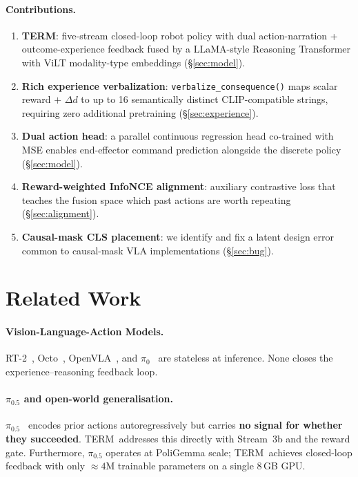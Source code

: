 \documentclass{article}
\newcommand{\modelname}{\textsc{TERM}\xspace}
\begin{document}
\paragraph{Contributions.}
\begin{enumerate}[leftmargin=1.5em,itemsep=2pt]
\item \textbf{\modelname}: five-stream closed-loop robot policy with dual
  action-narration + outcome-experience feedback fused by a LLaMA-style
  Reasoning Transformer with ViLT modality-type embeddings (\S\ref{sec:model}).
\item \textbf{Rich experience verbalization}: \texttt{verbalize\_consequence()}
  maps scalar reward $+$ $\Delta d$ to up to 16 semantically distinct
  CLIP-compatible strings, requiring zero additional pretraining (\S\ref{sec:experience}).
\item \textbf{Dual action head}: a parallel continuous regression head
  co-trained with MSE enables end-effector command prediction alongside the
  discrete policy (\S\ref{sec:model}).
\item \textbf{Reward-weighted InfoNCE alignment}: auxiliary contrastive loss
  that teaches the fusion space which past actions are worth repeating
  (\S\ref{sec:alignment}).
\item \textbf{Causal-mask CLS placement}: we identify and fix a latent
  design error common to causal-mask VLA implementations (\S\ref{sec:bug}).
\end{enumerate}

\section{Related Work}
\label{sec:related}

\paragraph{Vision-Language-Action Models.}
RT-2~\citep{brohan2023rt2}, Octo~\citep{octo2024}, OpenVLA~\citep{kim2024openvla},
and $\pi_0$~\citep{black2024pi0} are stateless at inference.
None closes the experience--reasoning feedback loop.

\paragraph{$\pi_{0.5}$ and open-world generalisation.}
$\pi_{0.5}$~\citep{hejna2025pi05} encodes prior actions autoregressively
but carries \textbf{no signal for whether they succeeded}.
\modelname\ addresses this directly with Stream~3b and the reward gate.
Furthermore, $\pi_{0.5}$ operates at PoliGemma scale;
\modelname\ achieves closed-loop feedback with only ${\approx}4$M
trainable parameters on a single 8\,GB GPU.
\end{document}
